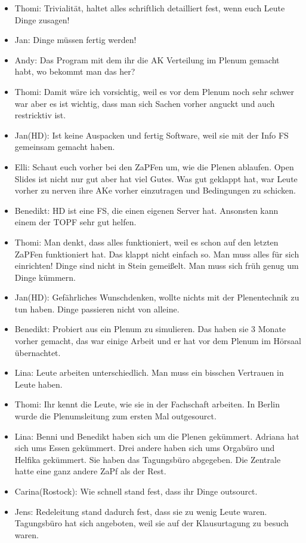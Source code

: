 \begin{itemize}
      \item Thomi: Trivialität, haltet alles schriftlich detailliert fest, wenn euch Leute Dinge zusagen!
      \item Jan: Dinge müssen fertig werden!
      \item Andy: Das Program mit dem ihr die AK Verteilung im Plenum gemacht habt, wo bekommt man das her?
      \item Thomi: Damit wäre ich vorsichtig, weil es vor dem Plenum noch sehr schwer war aber es ist wichtig, dass man sich Sachen vorher anguckt und auch restricktiv ist.
      \item Jan(HD): Ist keine Auspacken und fertig Software, weil sie mit der Info FS gemeinsam gemacht haben.
      \item Elli: Schaut euch vorher bei den ZaPFen um, wie die Plenen ablaufen. Open Slides ist nicht nur gut aber hat viel Gutes. Was gut geklappt hat, war Leute vorher zu nerven ihre AKe vorher einzutragen und Bedingungen zu schicken.
      \item Benedikt: HD ist eine FS, die einen eigenen Server hat. Ansonsten kann einem der TOPF sehr gut helfen.
      \item Thomi: Man denkt, dass alles funktioniert, weil es schon auf den letzten ZaPFen funktioniert hat. Das klappt nicht einfach so. Man muss alles für sich einrichten! Dinge sind nicht in Stein gemeißelt. Man muss sich früh genug um Dinge kümmern.
      \item Jan(HD): Gefährliches Wunschdenken, wollte nichts mit der Plenentechnik zu tun haben. Dinge passieren nicht von alleine.
      \item Benedikt: Probiert aus ein Plenum zu simulieren. Das haben sie 3 Monate vorher gemacht, das war einige Arbeit und er hat vor dem Plenum im Hörsaal übernachtet.
      \item Lina: Leute arbeiten unterschiedlich. Man muss ein bisschen Vertrauen in Leute haben.
      \item Thomi: Ihr kennt die Leute, wie sie in der Fachschaft arbeiten. In Berlin wurde die Plenumsleitung zum ersten Mal outgesourct.
      \item Lina: Benni und Benedikt haben sich um die Plenen gekümmert. Adriana hat sich ums Essen gekümmert. Drei andere haben sich ums Orgabüro und Helfika gekümmert. Sie haben das Tagungsbüro abgegeben. Die Zentrale hatte eine ganz andere ZaPf als der Rest.
      \item Carina(Rostock): Wie schnell stand fest, dass ihr Dinge outsourct.
      \item Jens: Redeleitung stand dadurch fest, dass sie zu wenig Leute waren. Tagungsbüro hat sich angeboten, weil sie auf der Klausurtagung zu besuch waren.

\end{itemize}

